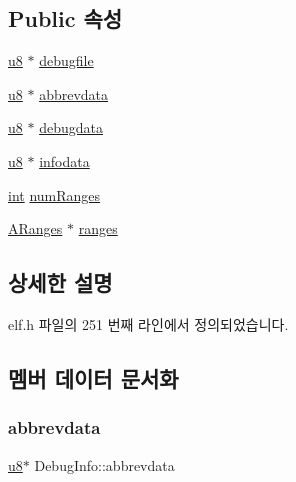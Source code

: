 \subsection*{Public 속성}
\begin{DoxyCompactItemize}
\item 
\mbox{\hyperlink{_system_8h_aed742c436da53c1080638ce6ef7d13de}{u8}} $\ast$ \mbox{\hyperlink{struct_debug_info_aea82946966b8b7d1ef959ae9c923a919}{debugfile}}
\item 
\mbox{\hyperlink{_system_8h_aed742c436da53c1080638ce6ef7d13de}{u8}} $\ast$ \mbox{\hyperlink{struct_debug_info_a4d23857bf21907f87641c4081a478f24}{abbrevdata}}
\item 
\mbox{\hyperlink{_system_8h_aed742c436da53c1080638ce6ef7d13de}{u8}} $\ast$ \mbox{\hyperlink{struct_debug_info_a5ee56575f46d355b29ad0a28d61c3d8a}{debugdata}}
\item 
\mbox{\hyperlink{_system_8h_aed742c436da53c1080638ce6ef7d13de}{u8}} $\ast$ \mbox{\hyperlink{struct_debug_info_afa6aab954bee3f4e7070c8efa6cc569f}{infodata}}
\item 
\mbox{\hyperlink{_util_8cpp_a0ef32aa8672df19503a49fab2d0c8071}{int}} \mbox{\hyperlink{struct_debug_info_adcb1491b1a4434a104942115f82b820c}{num\+Ranges}}
\item 
\mbox{\hyperlink{struct_a_ranges}{A\+Ranges}} $\ast$ \mbox{\hyperlink{struct_debug_info_ad048748b52971c0564054f85a1ed6093}{ranges}}
\end{DoxyCompactItemize}


\subsection{상세한 설명}


elf.\+h 파일의 251 번째 라인에서 정의되었습니다.



\subsection{멤버 데이터 문서화}
\mbox{\label{struct_debug_info_a4d23857bf21907f87641c4081a478f24}} 
\subsubsection{\texorpdfstring{abbrevdata}{abbrevdata}}
{\footnotesize\ttfamily \mbox{\hyperlink{_system_8h_aed742c436da53c1080638ce6ef7d13de}{u8}}$\ast$ Debug\+Info\+::abbrevdata}



